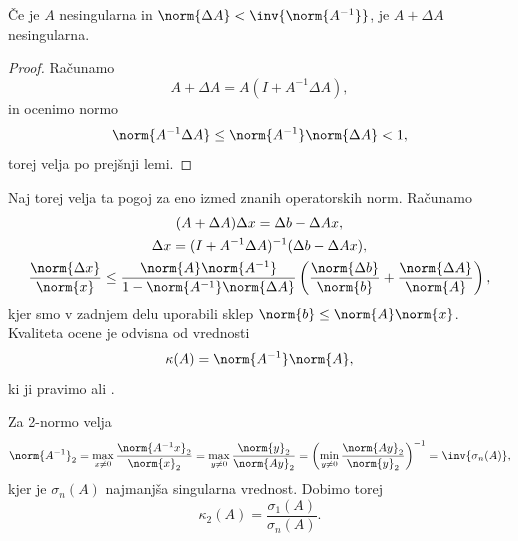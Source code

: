 \begin{lema}
  Če je $A$ nesingularna in $\norm{\Delta A} < \inv{\norm{A^{-1}}}$, je $A +
  \Delta A$ nesingularna.
\end{lema}

\begin{proof}
  Računamo
  \[
	A + \Delta A = A(I + A^{-1} \Delta A),
  \]
  in ocenimo normo
  \[
	\norm{A^{-1} \Delta A} \le \norm{A^{-1}} \norm{\Delta A} < 1,
  \]
  torej velja po prejšnji lemi.
\end{proof}

Naj torej velja ta pogoj za eno izmed znanih operatorskih norm.
Računamo
\begin{gather*}
  (A + \Delta A) \Delta x = \Delta b - \Delta A x, \\
  \Delta x = (I + A^{-1} \Delta A)^{-1} (\Delta b - \Delta A x), \\
  \frac{\norm{\Delta x}}{\norm{x}}
  \le \frac{\norm{A} \norm{A^{-1}}}{1 - \norm{A^{-1}} \norm{\Delta A}}
  \left( \frac{\norm{\Delta b}}{\norm{b}} + \frac{\norm{\Delta A}}{\norm{A}}
  \right),
\end{gather*}
kjer smo v zadnjem delu uporabili sklep $\norm{b} \le \norm{A} \norm{x}$.
Kvaliteta ocene je odvisna od vrednosti
\[
  \kappa(A) = \norm{A^{-1}} \norm{A},
\]
ki ji pravimo  ali .

Za 2-normo velja
\[
  \norm{A^{-1}}_2
  = \max_{x \ne 0} \frac{\norm{A^{-1} x}_2}{\norm{x}_2}
  = \max_{y \ne 0} \frac{\norm{y}_2}{\norm{Ay}_2}
  = \left( \min_{y \ne 0} \frac{\norm{Ay}_2}{\norm{y}_2} \right)^{-1}
  = \inv{\sigma_n(A)},
\]
kjer je $\sigma_n(A)$ najmanjša singularna vrednost.
Dobimo torej
\[
  \kappa_2(A) = \frac{\sigma_1(A)}{\sigma_n(A)}.
\]



